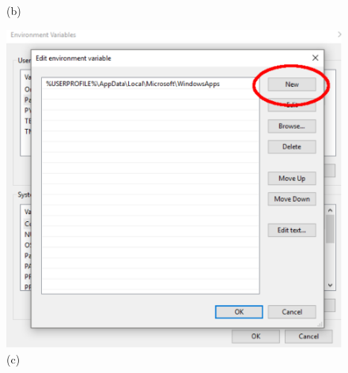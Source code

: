 \begin{figure}
\begin{center}
\begin{minipage}[t]{.29\textwidth}
\begin{center}
(b)
\end{center}
\end{minipage}
\begin{minipage}[t]{.29\textwidth}
\begin{center}
\includegraphics[width=\textwidth]{Figures/win/Win3.pdf}
(c)
\end{center}
\end{minipage}


\end{center}
\end{figure}
